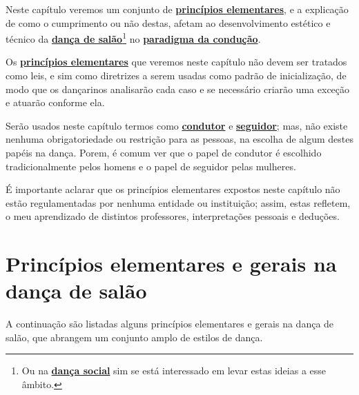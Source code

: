 \PRLsep{*}

Neste capítulo veremos um conjunto de \hyperref[def:Principio]{\textbf{princípios elementares}}, 
e a explicação de como o cumprimento ou não destas, 
afetam ao desenvolvimento estético e técnico da \hyperref[def:DancaSalao]{\textbf{dança de 
salão}}\footnote{Ou na \hyperref[def:DancaSocial]{\textbf{dança social}} sim se está interessado em levar estas ideias a esse âmbito.}  no \hyperref[def:ParadigmaConducao]{\textbf{paradigma da condução}}.

Os \hyperref[def:Principio]{\textbf{princípios elementares}} que veremos neste capítulo não devem ser
tratados como leis, e sim como diretrizes a serem usadas como padrão de inicialização, de modo que 
os dançarinos analisarão cada caso e se necessário criarão uma exceção e atuarão conforme ela.

Serão usados neste capítulo termos como \hyperref[def:Condutor]{\textbf{condutor}} e \hyperref[def:Seguidor]{\textbf{seguidor}}; 
mas, não existe nenhuma obrigatoriedade ou restrição para as pessoas, 
na escolha de algum destes papéis na dança.
Porem, é comum ver que o papel de condutor é escolhido tradicionalmente pelos homens e o papel de seguidor pelas mulheres.
\begin{tcbattention}
É importante aclarar
que os princípios elementares expostos neste capítulo não estão regulamentadas por nenhuma entidade ou instituição; assim, estas
refletem, o meu aprendizado de distintos professores,
interpretações pessoais  e deduções. 
\end{tcbattention}

\section{Princípios elementares e gerais na dança de salão}
\label{sec:PrincipioGeral}

A continuação são listadas alguns princípios elementares e gerais na dança de salão, 
que abrangem um conjunto amplo de estilos de dança.\\

